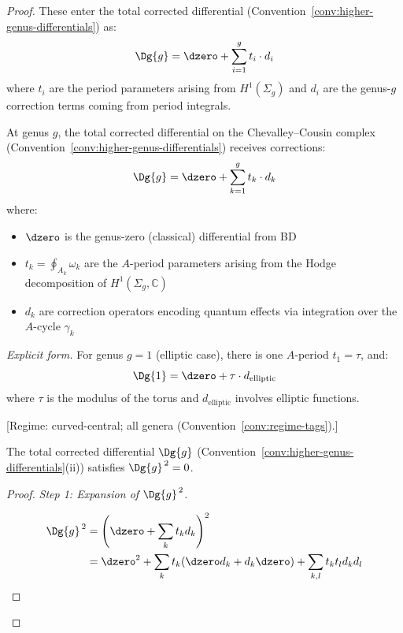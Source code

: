\begin{proof}
These enter the total corrected differential
(Convention~\ref{conv:higher-genus-differentials}) as:
\[\Dg{g} = \dzero + \sum_{i=1}^g t_i \cdot d_i\]
where $t_i$ are the period parameters arising from $H^1(\Sigma_g)$ and $d_i$ are the
genus-$g$ correction terms coming from period integrals.

\begin{definition}\label{def:quantum-differential}
At genus $g$, the total corrected differential on the Chevalley--Cousin
complex (Convention~\ref{conv:higher-genus-differentials}) receives corrections:
\[\Dg{g} = \dzero + \sum_{k=1}^{g} t_k \cdot d_k\]
where:
\begin{itemize}
\item $\dzero$ is the genus-zero (classical) differential from BD
\item $t_k = \oint_{A_k} \omega_k$ are the $A$-period parameters arising from the Hodge decomposition of $H^1(\Sigma_g, \mathbb{C})$
\item $d_k$ are correction operators encoding quantum effects via integration over the $A$-cycle $\gamma_k$
\end{itemize}

\emph{Explicit form.} For genus $g=1$ (elliptic case), there is one $A$-period $t_1 = \tau$, and:
\[\Dg{1} = \dzero + \tau \cdot d_{\text{elliptic}}\]
where $\tau$ is the modulus of the torus and $d_{\text{elliptic}}$ involves elliptic functions.
\end{definition}

\begin{theorem}[Key property: \texorpdfstring{$\Dg{g}^{\,2} = 0$}{D(g) squared = 0}; \ClaimStatusProvedHere]\label{thm:quantum-diff-squares-zero}
\textup{[Regime: curved-central; all genera
\textup{(}Convention~\textup{\ref{conv:regime-tags})}.]}

The total corrected differential $\Dg{g}$ \textup{(}Convention~\textup{\ref{conv:higher-genus-differentials}(ii))} satisfies $\Dg{g}^{\,2} = 0$.
\end{theorem}

\begin{proof}
\emph{Step 1: Expansion of $\Dg{g}^{\,2}$.}

\begin{align*}
\Dg{g}^{\,2} &= \left(\dzero + \sum_k t_k d_k\right)^2 \\
&= \dzero^2 + \sum_k t_k (\dzero d_k + d_k \dzero) + \sum_{k,l} t_k t_l d_k d_l
\end{align*}


\end{proof}
\end{proof}
